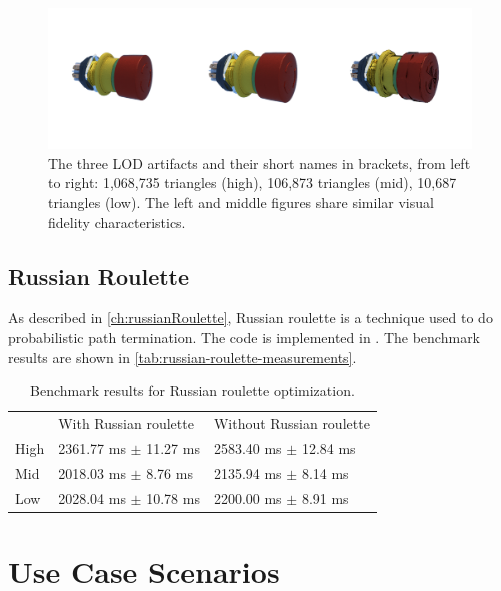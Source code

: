 \begin{figure}[H]
    \includegraphics[width=0.9\columnwidth]{resources/benchmark-models.png}
    \caption{The three LOD artifacts and their short names in brackets, from left to right: 1,068,735 triangles (high), 106,873 triangles (mid), 10,687 triangles (low). The left and middle figures share similar visual fidelity characteristics.}
    \label{fig:benchmark-models}
\end{figure}

\subsection{Russian Roulette}

As described in \autoref{ch:russianRoulette}, Russian roulette is a technique used to do probabilistic path termination. The code is implemented in . The benchmark results are shown in \autoref{tab:russian-roulette-measurements}.

\begin{table}[H]
    \centering
    \begin{tabular}{@{}lll@{}}
    \toprule
    & With Russian roulette & Without Russian roulette \\
    High & 2361.77 ms $\pm$ 11.27 ms & 2583.40 ms $\pm$ 12.84 ms \\
    Mid & 2018.03 ms $\pm$ 8.76 ms & 2135.94 ms $\pm$ 8.14 ms \\
    Low & 2028.04 ms $\pm$ 10.78 ms & 2200.00 ms $\pm$ 8.91 ms \\
    \bottomrule
    \end{tabular}
    \caption{Benchmark results for Russian roulette optimization.}
    \label{tab:russian-roulette-measurements}
\end{table}

\section{Use Case Scenarios}
